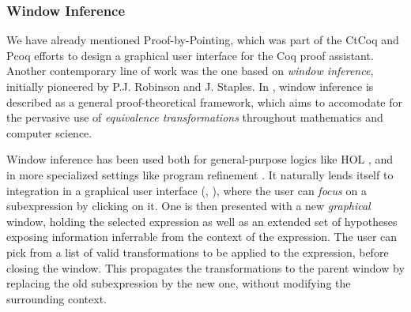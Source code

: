 
\subsubsection*{Window Inference}
We have already mentioned Proof-by-Pointing, which was part of the CtCoq and
Pcoq efforts \cite{amerkad-mathematics-2001} to design a graphical user
interface for the Coq proof assistant. Another contemporary line of work was the
one based on \emph{window inference}, initially pioneered by P.J. Robinson and
J. Staples. In \cite{robinson-formalizing-1993}, window inference is described
as a general proof-theoretical framework, which aims to accomodate for the
pervasive use of \emph{equivalence transformations} throughout mathematics and
computer science.

Window inference has been used both for general-purpose logics like
HOL \cite{grundy-window-1991}, and in more specialized settings like
program refinement \cite{grundy-window-1992}. It naturally lends
itself to integration in a graphical user interface
(\cite{langbacka-tkwinhol-1995}, \cite{goos-tas-2000}), where the user
can \emph{focus} on a subexpression by clicking on it. One is then
presented with a new \emph{graphical} window, holding the selected
expression as well as an extended set of hypotheses exposing
information inferrable from the context of the expression. The user
can pick from a list of valid transformations to be applied to the
expression, before closing the window. This propagates the
transformations to the parent window by replacing the old
subexpression by the new one, without modifying the surrounding
context.

